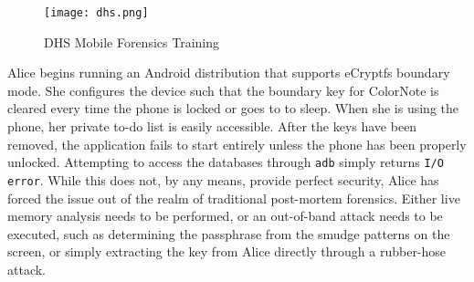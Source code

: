 \begin{figure}[ht] \begin{center}
\texttt{[image: dhs.png]}\end{center}
\caption{DHS Mobile Forensics Training} \label{fig:dhs} \end{figure}

Alice begins running an Android distribution that supports eCryptfs boundary mode. She configures the device such that the boundary
key for ColorNote is cleared every time the phone is locked or goes to to sleep. When she is using the phone, her private to-do list
is easily accessible. After the keys have been removed, the application fails to start entirely unless the phone has been properly
unlocked. Attempting to access the databases through \texttt{adb} simply returns \texttt{I/O error}. While this does not, by any
means, provide perfect security, Alice has forced the issue out of the realm of traditional post-mortem forensics. Either live
memory analysis needs to be performed, or an out-of-band attack needs to be executed, such as determining the passphrase from the
smudge patterns on the screen, or simply extracting the key from Alice directly through a rubber-hose attack.
